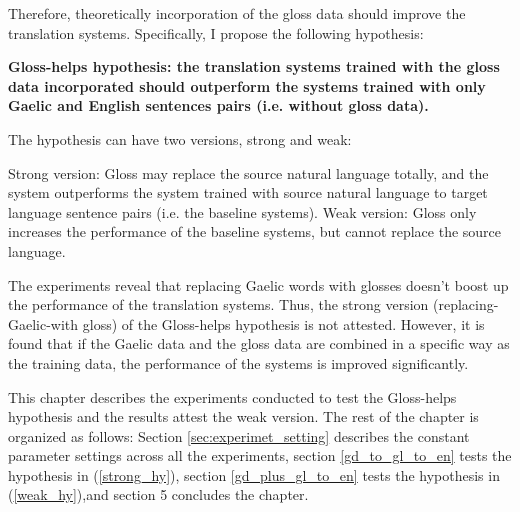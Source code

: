 \documentclass[a4paper]{article}
\begin{document}
Therefore, theoretically incorporation of the gloss data should improve the translation systems. Specifically, I propose the following hypothesis:
\begin{exe}  
\ex \textbf{Gloss-helps hypothesis: the translation systems trained with the gloss data incorporated should outperform the systems trained with only Gaelic and English sentences pairs (i.e. without gloss data).}

The hypothesis can have two versions, strong and weak:
	\begin{xlist}
	\ex \label{strong_hy} Strong version: Gloss may replace the source natural language totally, and the system outperforms the system trained with source natural language to target language sentence pairs (i.e. the baseline systems).   
	\ex \label{weak_hy} Weak version: Gloss only increases the performance of the baseline systems, but cannot replace the source language. 
	\end{xlist}
\end{exe}

The experiments reveal that replacing Gaelic words with glosses doesn't boost up the performance of the translation systems. Thus, the strong version (replacing-Gaelic-with gloss) of the Gloss-helps hypothesis is not attested. However, it is found that if the Gaelic data and the gloss data are combined in a specific way as the training data, the performance of the systems is improved significantly.  

This chapter describes the experiments conducted to test the Gloss-helps hypothesis and the results attest the weak version. 
The rest of the chapter is organized as follows: Section \ref{sec:experimet_setting} describes the constant parameter settings across all the experiments, section \ref{gd_to_gl_to_en} tests the hypothesis in (\ref{strong_hy}), section \ref{gd_plus_gl_to_en} tests the hypothesis in (\ref{weak_hy}),and section 5 concludes the chapter.  

\end{document}
